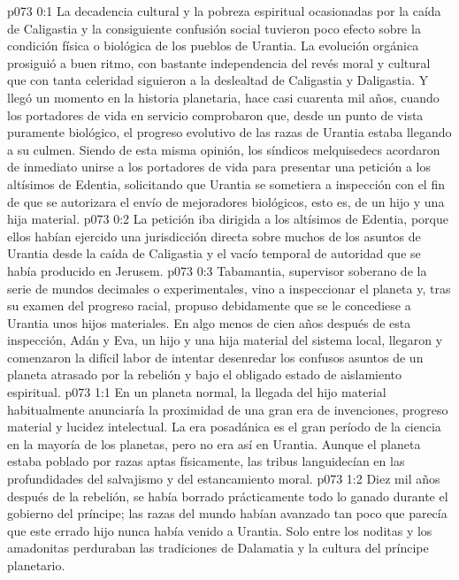 \author{Solonia}
\vs p073 0:1 La decadencia cultural y la pobreza espiritual ocasionadas por la caída de Caligastia y la consiguiente confusión social tuvieron poco efecto sobre la condición física o biológica de los pueblos de Urantia. La evolución orgánica prosiguió a buen ritmo, con bastante independencia del revés moral y cultural que con tanta celeridad siguieron a la deslealtad de Caligastia y Daligastia. Y llegó un momento en la historia planetaria, hace casi cuarenta mil años, cuando los portadores de vida en servicio comprobaron que, desde un punto de vista puramente biológico, el progreso evolutivo de las razas de Urantia estaba llegando a su culmen. Siendo de esta misma opinión, los síndicos melquisedecs acordaron de inmediato unirse a los portadores de vida para presentar una petición a los altísimos de Edentia, solicitando que Urantia se sometiera a inspección con el fin de que se autorizara el envío de mejoradores biológicos, esto es, de un hijo y una hija material.
\vs p073 0:2 La petición iba dirigida a los altísimos de Edentia, porque ellos habían ejercido una jurisdicción directa sobre muchos de los asuntos de Urantia desde la caída de Caligastia y el vacío temporal de autoridad que se había producido en Jerusem.
\vs p073 0:3 Tabamantia, supervisor soberano de la serie de mundos decimales o experimentales, vino a inspeccionar el planeta y, tras su examen del progreso racial, propuso debidamente que se le concediese a Urantia unos hijos materiales. En algo menos de cien años después de esta inspección, Adán y Eva, un hijo y una hija material del sistema local, llegaron y comenzaron la difícil labor de intentar desenredar los confusos asuntos de un planeta atrasado por la rebelión y bajo el obligado estado de aislamiento espiritual.
\vs p073 1:1 En un planeta normal, la llegada del hijo material habitualmente anunciaría la proximidad de una gran era de invenciones, progreso material y lucidez intelectual. La era posadánica es el gran período de la ciencia en la mayoría de los planetas, pero no era así en Urantia. Aunque el planeta estaba poblado por razas aptas físicamente, las tribus languidecían en las profundidades del salvajismo y del estancamiento moral.
\vs p073 1:2 Diez mil años después de la rebelión, se había borrado prácticamente todo lo ganado durante el gobierno del príncipe; las razas del mundo habían avanzado tan poco que parecía que este errado hijo nunca había venido a Urantia. Solo entre los noditas y los amadonitas perduraban las tradiciones de Dalamatia y la cultura del príncipe planetario.
